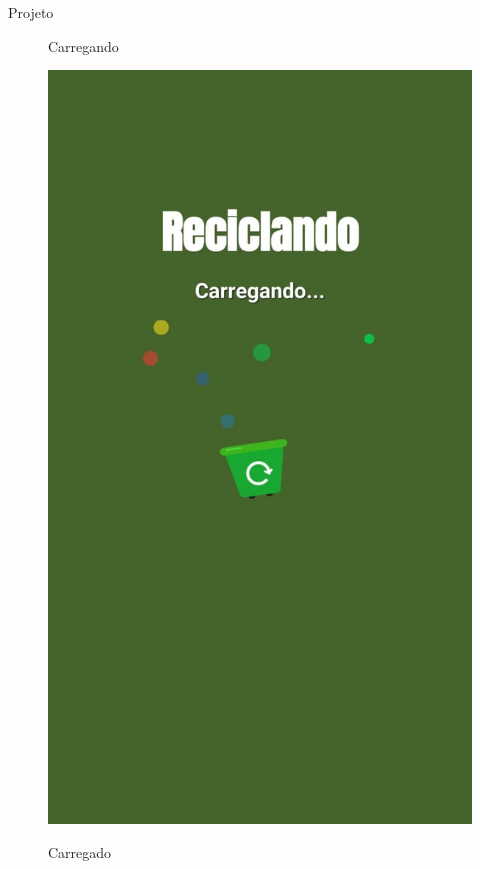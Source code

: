\documentclass[
	12pt,				%
	openright,			%
	twoside,			%
	a4paper,			%
	english,			%
	french,				%
	spanish,			%
	brazil				%
	]{abntex2}
\begin{document}
\begin{chapter}{Projeto}
    \begin{figure}[htb]    
 \centering
  \begin{minipage}{0.5\textwidth}
    \centering
    \caption{Carregando}
    \includegraphics[scale=0.35]{media/tela_splash_1.jpg}
     \label{fig:tela_splash_1_app}
  \end{minipage}
  \hfill
  \begin{minipage}{0.45\textwidth}
    \centering
    \caption{Carregado}

\end{minipage}
\end{figure}
\end{chapter}
\end{document}
